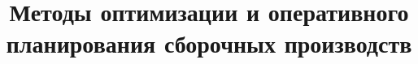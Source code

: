 \documentclass[14pt,a4paper,russian]{extreport}
\begin{document}
\title{Методы оптимизации и оперативного планирования сборочных производств}

\maketitle

\tableofcontents %








\end{document}
